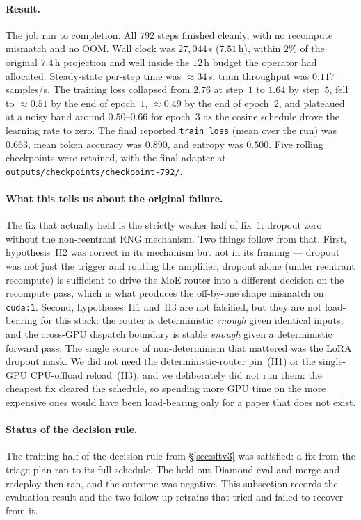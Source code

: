 \documentclass[11pt]{article}
\begin{document}
\paragraph{Result.} The job ran to completion. All $792$ steps
finished cleanly, with no recompute mismatch and no OOM. Wall clock
was $27{,}044$\,s ($7.51$\,h), within $2\%$ of the original $7.4$\,h
projection and well inside the $12$\,h budget the operator had
allocated. Steady-state per-step time was $\approx\!34$\,s; train
throughput was $0.117$\,samples/s. The training loss collapsed from
$2.76$ at step~$1$ to $1.64$ by step~$5$, fell to $\approx\!0.51$ by
the end of epoch~$1$, $\approx\!0.49$ by the end of epoch~$2$, and
plateaued at a noisy band around $0.50$--$0.66$ for epoch~$3$ as the
cosine schedule drove the learning rate to zero. The final reported
\texttt{train\_loss} (mean over the run) was $0.663$, mean token
accuracy was $0.890$, and entropy was $0.500$. Five rolling
checkpoints were retained, with the final adapter at
\texttt{outputs/checkpoints/checkpoint-792/}.

\paragraph{What this tells us about the original failure.} The fix
that actually held is the strictly weaker half of fix~1: dropout zero
without the non-reentrant RNG mechanism. Two things follow from
that. First, hypothesis~H2 was correct in its mechanism but not in
its framing --- dropout was not just the trigger and routing the
amplifier, dropout alone (under reentrant recompute) is sufficient
to drive the MoE router into a different decision on the recompute
pass, which is what produces the off-by-one shape mismatch on
\texttt{cuda:1}. Second, hypotheses~H1 and~H3 are not falsified, but
they are not load-bearing for this stack: the router is determinis\-tic
\emph{enough} given identical inputs, and the cross-GPU dispatch
boundary is stable \emph{enough} given a deterministic forward pass.
The single source of non-determinism that mattered was the LoRA
dropout mask. We did not need the deterministic-router pin~(H1) or
the single-GPU CPU-offload reload~(H3), and we deliberately did not
run them: the cheapest fix cleared the schedule, so spending more
GPU time on the more expensive ones would have been load-bearing
only for a paper that does not exist.

\paragraph{Status of the decision rule.} The training half of the
decision rule from \S\ref{sec:sftv3} was satisfied: a fix from the
triage plan ran to its full schedule. The held-out Diamond eval and
merge-and-redeploy then ran, and the outcome was negative. This
subsection records the evaluation result and the two follow-up
retrains that tried and failed to recover from it.
\end{document}
